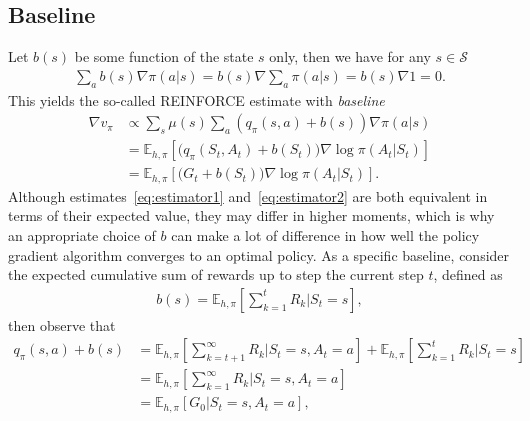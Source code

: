 \documentclass[a4paper]{article}
\begin{document}
\subsection{Baseline}
Let $b(s)$ be some function of the state $s$ only, then we have for any $s \in \mathcal{S}$
\begin{align}
  \sum_{a} b(s) \nabla \pi(a | s) = b(s) \nabla \sum_{a} \pi(a | s) = b(s) \nabla 1 = 0 .
\end{align}
This yields the so-called REINFORCE estimate with \textit{baseline}
\begin{subequations}
\begin{align}
  \nabla v_{\pi} &\propto \sum_{s} \mu(s) \sum_{a} (q_{\pi}(s, a) + b(s)) \nabla \pi(a | s) \\
          &= \mathbb{E}_{h, \pi} \left[ \bigl(q_{\pi}(S_{t}, A_{t}) + b(S_{t}) \bigr) \nabla \log \pi(A_{t} | S_{t}) \right] \\
  &= \mathbb{E}_{h, \pi} \left[ \bigl(G_{t} + b(S_{t}) \bigr) \nabla \log \pi(A_{t} | S_{t}) \right] .
  \label{eq:estimator2}
\end{align}
\end{subequations}
%
Although estimates~\eqref{eq:estimator1} and~\eqref{eq:estimator2} are both equivalent in terms of their expected
value, they may differ in higher moments, which is why an appropriate choice of
$b$ can make a lot of difference in how well the policy gradient algorithm
converges to an optimal policy.
%
As a specific baseline, consider the expected cumulative sum of rewards up to
step the current step $t$, defined as
\begin{align}
  b(s) = \mathbb{E}_{h,\pi} \left[ \sum_{k=1}^{t} R_{k} \Big| S_{t} = s \right],
\end{align}
then observe that
\begin{subequations}
\begin{align}
  q_{\pi}(s, a) + b(s) &= \mathbb{E}_{h,\pi}\left[ \sum_{k=t+1}^{\infty} R_{k} \Big| S_{t} = s , A_{t} = a \right] + \mathbb{E}_{h,\pi}\left[ \sum_{k=1}^{t} R_{k} \Big| S_{t} = s \right] \\
                     &= \mathbb{E}_{h,\pi}\left[ \sum_{k=1}^{\infty}  R_{k} \Big| S_{t} = s, A_{t} = a \right] \\
                     &= \mathbb{E}_{h,\pi} [ G_{0} | S_{t} = s, A_{t} = a ] ,
\end{align}
\end{subequations}
\end{document}
